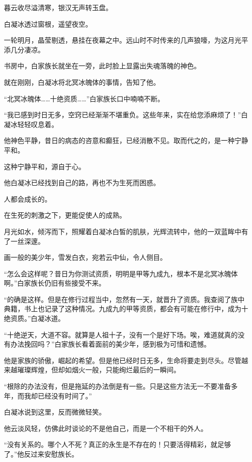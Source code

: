 
\begin{this_body}

暮云收尽溢清寒，银汉无声转玉盘。

白凝冰透过窗根，遥望夜空。

一轮明月，晶莹剔透，悬挂在夜幕之中。远山时不时传来的几声狼嚎，为这月光平添几分凄凉。

书房中，白家族长就坐在一旁，此时脸上显露出失魂落魄的神色。

就在刚刚，白凝冰将北冥冰魄体的事情，告知了他。

“北冥冰魄体……十绝资质……”白家族长口中喃喃不断。

“我已感到时日无多，空窍已经渐渐不堪重负。这些年来，实在给您添麻烦了！”白凝冰轻轻叹息着。

他神色平静，昔日的病态的咨意和癫狂，已经消散不见。取而代之的，是一种宁静平和。

这种宁静平和，源自于心。

他白凝冰已经找到自己的路，再也不为生死而困惑。

人都会成长的。

在生死的刺激之下，更能促使人的成熟。

月光如水，倾泻而下，照耀着白凝冰白皙的肌肤，光辉流转中，他的一双蓝眸中有了一丝深邃。

画一般的美少年，雪发白衣，宛若云中仙，令人侧目。

“怎么会这样呢？昔日为你测试资质，明明是甲等九成九，根本不是北冥冰魄体啊。”白家族长仍旧有些接受不来。

“的确是这样。但是在修行过程当中，忽然有一天，就晋升了资质。我查阅了族中典籍，书上也记录了这种情况。九成九的甲等资质，都会有可能在修行中，成为十绝资质。”白凝冰道。

“十绝逆天，大道不容。就算是人祖十子，没有一个是好下场。唉，难道就真的没有办法挽回吗？”白家族长看着面前的美少年，感到极为可惜和遗憾。

他是家族的骄傲，崛起的希望。但是他已经时日无多，生命将要走到尽头。尽管越来越璀璨辉煌，但却如烟火一般，只能绚烂最后的一瞬间。

“根除的办法没有，但是拖延的办法倒是有一些。只是这些方法无一不要准备多年，而我却已经没有时间了。”

白凝冰说到这里，反而微微轻笑。

他云淡风轻，仿佛此时谈论的不是他自己，而是一个不相干的外人。

“没有关系的。哪个人不死？真正的永生是不存在的！只要活得精彩，就足够了。”他反过来安慰族长。


\end{this_body}
